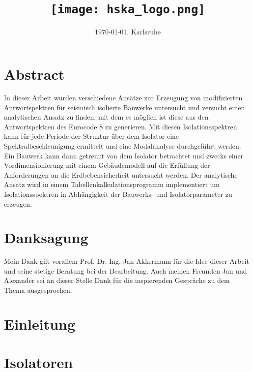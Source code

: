 \documentclass[12pt, oneside]{report}
\title{
	{\GetTitle{}}\\
	{\texttt{[image: hska\_logo.png]}}
}
\author{\GetAuthor{}}
\date{\today{}, Karlsruhe}
\begin{document}

\maketitle
\setcounter{page}{1}

\chapter*{\centering Abstract}
In dieser Arbeit wurden verschiedene Ansätze zur Erzeugung von modifizierten Antwortspektren für seismisch isolierte Bauwerke untersucht und versucht einen analytischen Ansatz zu finden, mit dem es möglich ist diese aus den Antwortspektren des Eurocode 8 zu generieren.
Mit diesen Isolationsspektren kann für jede Periode der Struktur über dem Isolator eine Spektralbeschleunigung ermittelt und eine Modalanalyse durchgeführt werden.
Ein Bauwerk kann dann getrennt von dem Isolator betrachtet und zwecks einer Vordimensionierung mit einem Gebäudemodell auf die Erfüllung der Anforderungen an die Erdbebensicherheit untersucht werden.
Der analytische Ansatz wird in einem Tabellenkalkulationsprogramm implementiert um Isolationsspektren in Abhängigkeit der Bauwerks- und Isolatorparameter zu erzeugen.

\chapter*{\centering Danksagung}

Mein Dank gilt vorallem Prof. Dr.-Ing. Jan Akkermann für die Idee dieser Arbeit und seine stetige Beratung bei der Bearbeitung.
Auch meinen Freunden Jan und Alexander sei an dieser Stelle Dank für die inspierenden Gespräche zu dem Thema ausgesprochen.

\pagestyle{empty}

\cleardoublepage
\tableofcontents
\cleardoublepage
{}

\clearpage
\pagestyle{fancy}

\chapter{Einleitung}


\chapter{Isolatoren}

\end{document}
